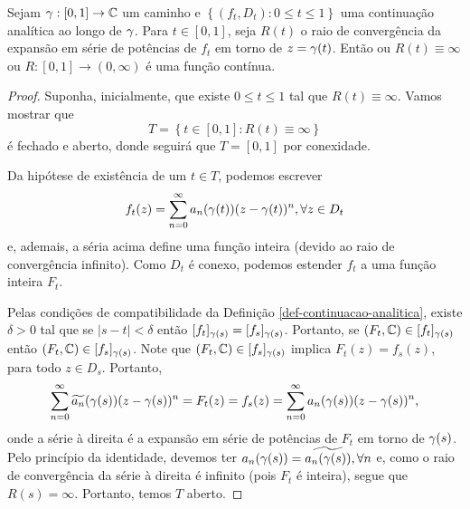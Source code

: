     \begin{lema}
    \label{lema-raio-convergencia-continuo}
        Sejam $\gamma: [0,1]\to\mathbb{C}$ um caminho e 
        $\left\{ (f_t, D_t): 0\leq t\leq 1 \right\}$ uma continuação analítica ao longo de
        $\gamma$. Para $t\in[0,1]$, seja $R(t)$ o raio de convergência da expansão em 
        série de potências de $f_t$ em torno de $z=\gamma(t)$. Então ou $R(t) \equiv\infty$
        ou $R: [0,1]\to (0, \infty)$ é uma função contínua.
    \end{lema}

    \begin{proof}
        Suponha, inicialmente, que existe $0\leq t\leq 1$ tal que $R(t)\equiv\infty$.
        Vamos mostrar que
        \begin{equation*}
            T = \left\{ t\in[0,1] : R(t)\equiv\infty \right\}
        \end{equation*}
        é fechado e aberto, donde seguirá que $T = [0,1]$ por conexidade.
        
        Da hipótese de existência de um $t\in T$, podemos escrever
        \begin{equation*}
            f_t(z) = \sum_{n=0}^\infty a_n(\gamma(t))(z - \gamma(t))^n, \forall z\in D_t
        \end{equation*}
        e, ademais, a séria acima define uma função inteira (devido ao raio de convergência
        infinito). Como $D_t$ é conexo, podemos estender $f_t$ a uma função inteira $F_t$.
        
        Pelas condições de compatibilidade da Definição \ref{def-continuacao-analitica},
        existe $\delta > 0$ tal que se $|s-t|<\delta$ então 
        $[f_t]_{\gamma(s)} = [f_s]_{\gamma(s)}$. Portanto, se
        $(F_t,\mathbb{C}) \in [f_t]_{\gamma(s)}$ então $(F_t,\mathbb{C}) \in [f_s]_{\gamma(s)}$.
        Note que $(F_t,\mathbb{C}) \in [f_s]_{\gamma(s)}$ implica $F_t(z) = f_s(z)$, para todo
        $z\in D_s$. Portanto, 
        \begin{align*}
            \sum_{n=0}^\infty \widetilde{a_n}(\gamma(s))(z-\gamma(s))^n 
            =
            F_t(z)
            =
            f_s(z)
            =
            \sum_{n=0}^\infty a_n(\gamma(s))(z-\gamma(s))^n,
        \end{align*}
        onde a série à direita é a expansão em série de potências de $F_t$ em torno 
        de $\gamma(s)$. Pelo princípio da identidade, devemos ter 
        $a_n(\gamma(s)) = \widetilde{a_n(\gamma(s))}, \forall n$ e, como o raio 
        de convergência da série à direita é infinito (pois $F_t$ é inteira), segue
        que $R(s) = \infty$. Portanto, temos $T$ aberto.
        

\end{proof}
